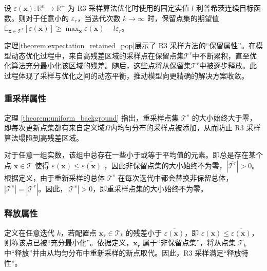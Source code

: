 \begin{theorem}[动态累积定理]
\label{theorem:expectation_retained_pop}
    设 $\varepsilon(\mathbf{x}):\mathbb{R}^n \rightarrow \mathbb{R}^+$ 为 R3 采样算法优化时使用的固定实值 $ l$-利普希茨连续目标函数。则对于任意小的 $\varepsilon _r$，当迭代次数 $k \rightarrow \infty$ 时，保留点集的期望值 $\mathbb{E}_{\mathbf{x} \in \mathcal{T}^r}[\varepsilon(\mathbf{x})] \geq \max_\mathbf{x} \varepsilon(\mathbf{x}) - l\varepsilon _r$。
\end{theorem}

定理\ref{theorem:expectation_retained_pop}展示了 R3 采样方法的“保留属性”。在模型动态优化过程中，来自高残差区域的采样点在保留点集$\mathcal{T}^r$中不断累积，直至优化算法充分最小化该区域的残差。随后，这些点将从保留集$\mathcal{T}^r$中被逐步释放。此过程体现了采样与优化之间的动态平衡，推动模型向更精确的解决方案收敛。

\subsubsection{重采样属性}

定理 \ref{theorem:uniform_background} 指出，重采样点集 $\mathcal{T}^s$ 的大小始终大于零，即每次更新点集都有来自定义域$\varOmega $内均匀分布的采样点被添加，从而防止 R3 采样算法塌陷到高残差区域。

\begin{theorem}[非空定理]
\label{theorem:uniform_background}
    对于任意一组实数，该组中总存在一些小于或等于平均值​​的元素。即总是存在某个点 $ \mathbf{x} \in \mathcal{T}$ 使得 $\varepsilon(\mathbf{x}) \leq \overline{\varepsilon(\mathbf{x})}$ ，因此非保留点集的大小始终不为零，$|\overline{\mathcal{T}^r}| > 0$。根据定义，由于重新采样的总体 $\mathcal{T}^s$ 在每次迭代中都会替换非保留总体，$|\mathcal{T}^s| = |\overline{\mathcal{T}^r}|$。因此，$|\mathcal{T}^s| > 0$，即重采样点集的大小始终不为零。
\end{theorem}

\subsubsection{释放属性}

定义在任意迭代 $k$，若配置点 $\mathbf{x_r} \in \mathcal{T}_k$ 的残差小于 $\overline{\varepsilon(\mathbf{x})}$，即 $\varepsilon(\mathbf{x}) \leq \overline{\varepsilon(\mathbf{x})}$，则称该点已被“充分最小化”。依据定义，$\mathbf{x_r}$ 属于“非保留点集”，将从点集 $\mathcal{T}_k$ 中“释放”并由从均匀分布中重新采样的新点取代。因此，R3 采样满足“释放特性”。

